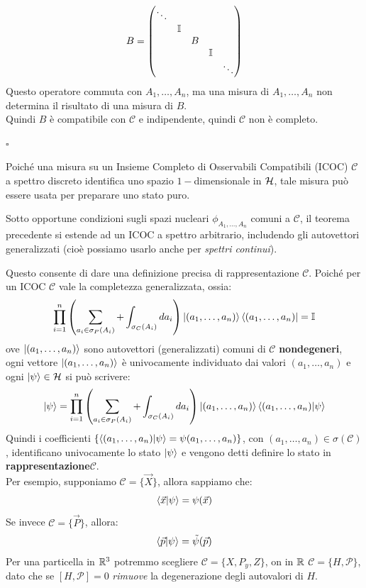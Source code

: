 \documentclass[../../FisicaTeorica.tex]{subfiles}
\begin{document}
\[
B=
\begin{pmatrix}
\ddots & & &\\
& \mathbb{I} & &\\
& & B & &\\
& & & \mathbb{I} &\\
& & & & \ddots
\end{pmatrix}
\]
Questo operatore commuta con $A_1, \dots, A_n$, ma una misura di $A_1, \dots, A_n$ non determina il risultato di una misura di $B$.\\
Quindi $B$ è compatibile con $\mathcal{C}$ e indipendente, quindi $\mathcal{C}$ non è completo.
\begin{flushright}
$\square$
\end{flushright}

\begin{oss}
Poiché una misura su un Insieme Completo di Osservabili Compatibili (ICOC) $\mathcal{C}$ a spettro discreto identifica uno spazio $1-$dimensionale in $\mathcal{H}$, tale misura può essere usata per preparare uno stato puro.
\end{oss}
\begin{oss}
Sotto opportune condizioni sugli spazi nucleari $\phi_{A_1,\dots,A_n}$ comuni a $\mathcal{C}$, il teorema precedente si estende ad un ICOC a spettro arbitrario, includendo gli autovettori generalizzati (cioè possiamo usarlo anche per \textit{spettri continui}).
\end{oss}
Questo consente di dare una definizione precisa di rappresentazione $\mathcal{C}$. Poiché per un ICOC $\mathcal{C}$ vale la completezza generalizzata, ossia:
\[
\prod_{i=1}^n \left(\sum_{a_i \in \sigma_P(A_i)} + \int_{\sigma_C(A_i)} da_i\right) \ket{(a_1,\dots,a_n)}\bra{(a_1,\dots,a_n)}=\mathbb{I}
\]
ove $\ket{(a_1, \dots, a_n)}$ sono autovettori (generalizzati) comuni di $\mathcal{C}$ \textbf{nondegeneri}, ogni vettore $\ket{(a_1, \dots, a_n)}$ è univocamente individuato dai valori $(a_1, \dots, a_n)$ e ogni $\ket{\psi}\in \mathcal{H}$ si può scrivere:
\[
\ket{\psi}=\prod_{i=1}^n \left(\sum_{a_i\in \sigma_P(A_i)} + \int_{\sigma_C(A_i)}da_i \right) \ket{(a_1, \dots, a_n)}\braket{(a_1, \dots, a_n)|\psi}
\]
Quindi i coefficienti $\{\braket{(a_1, \dots, a_n)|\psi}=\psi(a_1, \dots, a_n)\}$, con $(a_1, \dots, a_n)\in \sigma(\mathcal{C})$, identificano univocamente lo stato $\ket{\psi}$ e vengono detti definire lo stato in \textbf{rappresentazione}$\mathcal{C}$.\\
Per esempio, supponiamo $\mathcal{C}=\{\vec{X}\}$, allora sappiamo che:
\[
\braket{\vec{x}|\psi}=\psi(\vec{x})
\]
Se invece $\mathcal{C}=\{\vec{P}\}$, allora:
\[
\braket{\vec{p}|\psi}=\tilde{\psi}(\vec{p})
\]
Per una particella in $\mathbb{R}^3$ potremmo scegliere $\mathcal{C}=\{X,P_y, Z\}$, on in $\mathbb{R}$ $\mathcal{C}=\{H, \mathcal{P}\}$, dato che se $[H,\mathcal{P}]=0$ \textit{rimuove} la degenerazione degli autovalori di $H$.
\end{document}
